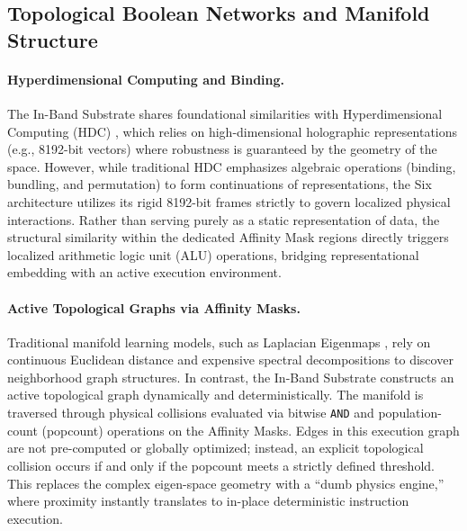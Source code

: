 \subsection{Topological Boolean Networks and Manifold Structure}
\label{sec:related_topological_boolean}

\paragraph{Hyperdimensional Computing and Binding.}
The In-Band Substrate shares foundational similarities with Hyperdimensional Computing (HDC) \citep{kanerva2009hyperdimensional}, which relies on high-dimensional holographic representations (e.g., 8192-bit vectors) where robustness is guaranteed by the geometry of the space. However, while traditional HDC emphasizes algebraic operations (binding, bundling, and permutation) to form continuations of representations, the Six architecture utilizes its rigid 8192-bit frames strictly to govern localized physical interactions. Rather than serving purely as a static representation of data, the structural similarity within the dedicated Affinity Mask regions directly triggers localized arithmetic logic unit (ALU) operations, bridging representational embedding with an active execution environment.

\paragraph{Active Topological Graphs via Affinity Masks.}
Traditional manifold learning models, such as Laplacian Eigenmaps \citep{belkin2003laplacian}, rely on continuous Euclidean distance and expensive spectral decompositions to discover neighborhood graph structures. In contrast, the In-Band Substrate constructs an active topological graph dynamically and deterministically. The manifold is traversed through physical collisions evaluated via bitwise \texttt{AND} and population-count (popcount) operations on the Affinity Masks. Edges in this execution graph are not pre-computed or globally optimized; instead, an explicit topological collision occurs if and only if the popcount meets a strictly defined threshold. This replaces the complex eigen-space geometry with a ``dumb physics engine,'' where proximity instantly translates to in-place deterministic instruction execution.

